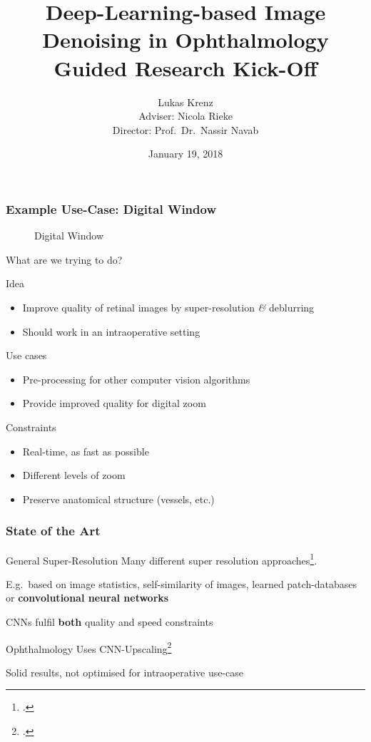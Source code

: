 \documentclass{beamer}
\title{Deep-Learning-based Image Denoising in Ophthalmology\\Guided Research Kick-Off}
\author{Lukas Krenz\\Adviser: Nicola Rieke\\Director: Prof.\ Dr.\ Nassir Navab}
\date{January 19, 2018}
\institute{TUM, Chair for Computer Aided Medical Procedures \textit{\&} Augmented Reality}
\begin{document}
\maketitle

\begin{frame}
  \frametitle{Example Use-Case: Digital Window}
   \begin{figure}[h]
    \centering
    \caption*{Digital Window}
    \label{fig:digital-window}
  \end{figure}
\end{frame}


\begin{frame}{What are we trying to do?}
\begin{block}{Idea}
\begin{itemize}
\item Improve quality of retinal images by super-resolution \textit{\&} deblurring
\item Should work in an intraoperative setting
\end{itemize}
\end{block}

\begin{block}{Use cases}
\begin{itemize}
\item Pre-processing for other computer vision algorithms
\item Provide improved quality for digital zoom
\end{itemize}
\end{block}

\begin{block}{Constraints}
  \begin{itemize}
  \item Real-time, as fast as possible
  \item Different levels of zoom
  \item Preserve anatomical structure (vessels, etc.)
  \end{itemize}
\end{block}
\end{frame}

\begin{frame}
  \frametitle{State of the Art}

\begin{block}{General Super-Resolution}
Many different super resolution approaches\footcite{SRsurvey}.
    
E.g.\ based on image statistics, self-similarity of images, learned patch-databases or \textbf{convolutional neural networks}

CNNs fulfil \textbf{both} quality and speed constraints
\end{block}


\begin{block}{Ophthalmology}
Uses CNN-Upscaling\footcite{SaliencyGAN} 

Solid results, not optimised for intraoperative use-case
\end{block}
\end{frame}
\end{document}
